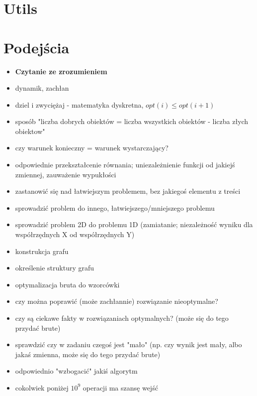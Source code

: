 \chapter{Utils}


\chapter{Podejścia}

\begin{itemize}[noitemsep]
	\item \textbf{Czytanie ze zrozumieniem}
	\item dynamik, zachłan
	\item dziel i zwyciężaj - matematyka dyskretna, $opt(i) \leq opt(i + 1)$
	\item sposób "liczba dobrych obiektów = liczba wszystkich obiektów - liczba złych obiektow"
	\item czy warunek konieczny = warunek wystarczający?
	\item odpowiednie przekształcenie równania; uniezależnienie funkcji od jakiejś zmiennej, zauważenie wypukłości
	\item zastanowić się nad łatwiejszym problemem, bez jakiegoś elementu z treści
	\item sprowadzić problem do innego, łatwiejszego/mniejszego problemu
	\item sprowadzić problem 2D do problemu 1D (zamiatanie; niezależność wyniku dla współrzędnych X od współrzędnych Y)
	\item konstrukcja grafu
	\item określenie struktury grafu
	\item optymalizacja bruta do wzorcówki
	\item czy można poprawić (może zachłannie) rozwiązanie nieoptymalne?
	\item czy są ciekawe fakty w rozwiązaniach optymalnych? (może się do tego przydać brute)
	\item sprawdzić czy w zadaniu czegoś jest "mało" (np. czy wynik jest mały, albo jakaś zmienna, może się do tego przydać brute)
	\item odpowiednio "wzbogacić" jakiś algorytm
	\item cokolwiek poniżej $10^9$ operacji ma szansę wejść

\end{itemize}
